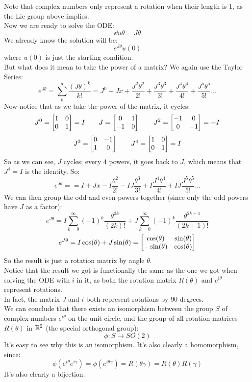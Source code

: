 \documentclass[12pt]{article}
\begin{document}
Note that complex numbers only represent a
rotation when their length is $1$,
as the Lie group above implies. \\

Now we are ready to solve the ODE:
\[ \dd{u}{\theta} = J\theta \]
We already know the solution will be:
\[ e^{J\theta}u(0) \]
where $u(0)$ is just the starting condition. \\
But what does it mean to take the power of a
matrix? 
We again use the Taylor Series:
\[ e^{J\theta} = \sum_{k}^{\infty} 
\dfrac{(J\theta)^k}{k!} 
= J^0 + Jx + \dfrac{J^2\theta^2}{2!}
+ \dfrac{J^3\theta^3}{3!} + \dfrac{J^4\theta^4}{4!}
+ \dfrac{J^5\theta^5}{5!} \dots \]
Now notice that as we take the power of the
matrix, it cycles:
\[ J^0 = \begin{bmatrix} {1}&{0}\\{0}&{1} \end{bmatrix} = I \qquad
J = \begin{bmatrix} {0}&{1}\\{-1}&{0} \end{bmatrix}
\qquad J^2 = \begin{bmatrix} {-1}&{0}\\{0}&{-1} \end{bmatrix} = -I \]
\[ J^3 = \begin{bmatrix} {0}&{-1}\\{1}&{0} \end{bmatrix}
\qquad J^4 = \begin{bmatrix} {1}&{0}\\{0}&{1} \end{bmatrix} = I \]
So as we can see, $J$ cycles;
every $4$ powers, it goes back to $J$,
which means that $J^4 = I$ is the identity.
So:
\[ e^{J\theta} =
= I + Jx -I\dfrac{\theta^2}{2!}
- IJ\dfrac{\theta^3}{3!} + I\dfrac{J^4\theta^4}{4!}
+ IJ\dfrac{J^5\theta^5}{5!} \dots \]
We can then group the odd and even powers
together (since only the odd powers have $J$
as a factor):
\[ e^{J\theta}
= I\sum_{k = 0}^{\infty} 
(-1)^{k} \dfrac{\theta^{2k}}{(2k)!}
+ J\sum_{k = 0}^{\infty} (-1)^{k}
\dfrac{\theta^{2k + 1}}{(2k + 1)!} \]
\[ e^{J\theta} = I\cos(\theta) + J\sin(\theta)
= \begin{bmatrix} {\cos(\theta)}&{\sin(\theta)}\\
{-\sin(\theta)}&{\cos(\theta)} \end{bmatrix} \]
So the result is just a rotation matrix
by angle $\theta$. \\

Notice that the result we got is functionally
the same as the one we got when solving the
ODE with $i$ in it,
as both the rotation matrix $R(\theta)$
and $e^{i\theta}$ represent rotations. \\
In fact, the matrix $J$ and $i$
both represent rotations by $90$ degrees. \\

We can conclude that there exists
an isomorphism between the group $S$
of complex numbers $e^{i\theta}$
on the unit circle, and the group of
all rotation matrices $R(\theta)$
in $\mathbb{R}^2$ (the special orthogonal group):
\[ \phi: S \to SO(2) \]
It's easy to see why this is an isomorphism.
It's also clearly a homomorphism,
since:
\[ \phi(e^{i\theta}e^{i\gamma})
= \phi(e^{i\theta \gamma})
= R(\theta \gamma) = R(\theta)R(\gamma) \]
It's also clearly a bijection. \\
\end{document}
